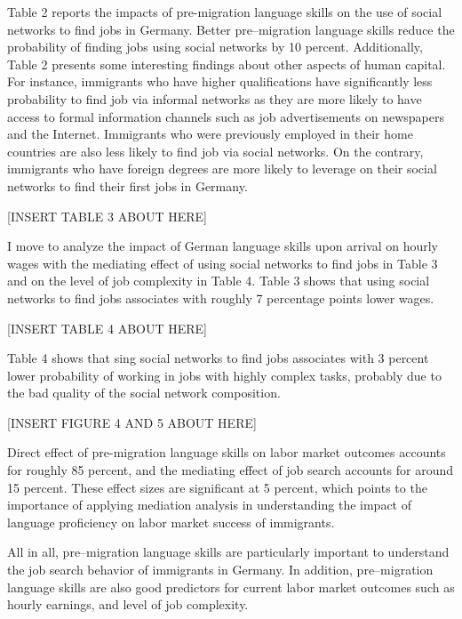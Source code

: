 \documentclass[12pt,a4paper]{article}
\begin{document}
Table 2 reports the impacts of pre-migration language skills on the use of social networks to find jobs in Germany. Better pre--migration language skills reduce the probability of finding jobs using social networks by 10 percent. Additionally, Table 2 presents some interesting findings about other aspects of human capital. For instance, immigrants who have higher qualifications have significantly less probability to find job via informal networks as they are more likely to have access to formal information channels such as job advertisements on newspapers and the Internet. Immigrants who were previously employed in their home countries are also less likely to find job via social networks. On the contrary, immigrants who have foreign degrees are more likely to leverage on their social networks to find their first jobs in Germany.

\begin{center}
[INSERT TABLE 3 ABOUT HERE]
\end{center}

I move to analyze the impact of German language skills upon arrival on hourly wages with the mediating effect of using social networks to find jobs in Table 3 and on the level of job complexity in Table 4. Table 3 shows that using social networks to find jobs associates with roughly 7 percentage points lower wages.

\begin{center}
[INSERT TABLE 4 ABOUT HERE]
\end{center}
Table 4 shows that sing social networks to find jobs associates with 3 percent lower probability of working in jobs with highly complex tasks, probably due to the bad quality of the social network composition. 

\begin{center}
[INSERT FIGURE 4 AND 5 ABOUT HERE]
\end{center}

Direct effect of pre-migration language skills on labor market outcomes accounts for roughly 85 percent, and the mediating effect of job search accounts for around 15 percent. These effect sizes are significant at 5 percent, which points to the importance of applying mediation analysis in understanding the impact of language proficiency on labor market success of immigrants. 

All in all, pre--migration language skills are particularly important to understand the job search behavior of immigrants in Germany. In addition, pre--migration language skills are also good predictors for current labor market outcomes such as hourly earnings, and level of job complexity.
\end{document}
